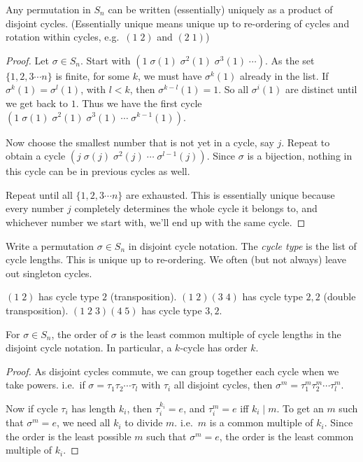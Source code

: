 \documentclass[a4paper]{article}
\begin{document}
\begin{thm}
  Any permutation in $S_n$ can be written (essentially) uniquely as a product of disjoint cycles. (Essentially unique means unique up to re-ordering of cycles and rotation within cycles, e.g.\ $(1\; 2)$ and $(2\; 1)$)
\end{thm}

\begin{proof}
  Let $\sigma\in S_n$. Start with $(1\; \sigma(1)\; \sigma^2(1)\; \sigma^3(1)\;\cdots)$. As the set $\{1, 2, 3\cdots n\}$ is finite, for some $k$, we must have $\sigma^k(1)$ already in the list. If $\sigma^k(1) = \sigma^l(1)$, with $l < k$, then $\sigma^{k-l}(1) = 1$. So all $\sigma^i(1)$ are distinct until we get back to $1$. Thus we have the first cycle $(1\; \sigma(1)\; \sigma^2(1)\; \sigma^3(1)\;\cdots\;\sigma^{k-1}(1))$.

  Now choose the smallest number that is not yet in a cycle, say $j$. Repeat to obtain a cycle $(j\; \sigma(j)\; \sigma^2(j)\;\cdots\; \sigma^{l - 1}(j))$. Since $\sigma$ is a bijection, nothing in this cycle can be in previous cycles as well.

  Repeat until all $\{1, 2, 3\cdots n\}$ are exhausted. This is essentially unique because every number $j$ completely determines the whole cycle it belongs to, and whichever number we start with, we'll end up with the same cycle.
\end{proof}

\begin{defi}
  Write a permutation $\sigma\in S_n$ in disjoint cycle notation. The \emph{cycle type} is the list of cycle lengths. This is unique up to re-ordering. We often (but not always) leave out singleton cycles.
\end{defi}
\begin{eg}
  $(1\; 2)$ has cycle type $2$ (transposition). $(1\; 2)(3\; 4)$ has cycle type $2, 2$ (double transposition). $(1\; 2\; 3)(4\; 5)$ has cycle type $3, 2$.
\end{eg}
\begin{lemma}
  For $\sigma\in S_n$, the order of $\sigma$ is the least common multiple of cycle lengths in the disjoint cycle notation. In particular, a $k$-cycle has order $k$.
\end{lemma}

\begin{proof}
  As disjoint cycles commute, we can group together each cycle when we take powers. i.e.\ if $\sigma = \tau_1\tau_2\cdots\tau_l$ with $\tau_i$ all disjoint cycles, then $\sigma^m = \tau_1^m\tau_2^m\cdots\tau_l^m$.

  Now if cycle $\tau_i$ has length $k_i$, then $\tau_i^{k_i} = e$, and $\tau_i^m = e$ iff $k_i \mid m$. To get an $m$ such that $\sigma^m = e$, we need all $k_i$ to divide $m$. i.e.\ $m$ is a common multiple of $k_i$. Since the order is the least possible $m$ such that $\sigma^m = e$, the order is the least common multiple of $k_i$.
\end{proof}
\end{document}
